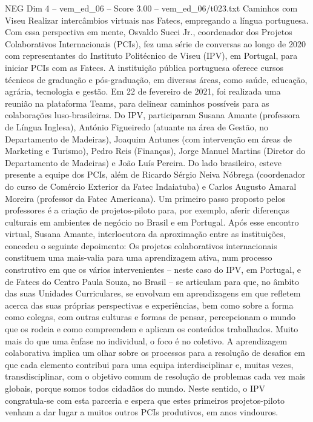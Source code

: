 \begin{textsample}{NEG Dim 4 – vem\_ed\_06 – Score 3.00 – vem\_ed\_06/t023.txt}  \label{ex:f4_neg_048}
Caminhos com Viseu Realizar intercâmbios virtuais nas Fatecs, empregando a língua portuguesa.
Com essa perspectiva em mente, Osvaldo Succi Jr., coordenador dos Projetos Colaborativos Internacionais (PCIs), fez uma série de conversas ao longo de 2020 com representantes do Instituto Politécnico de Viseu (IPV), em Portugal, para iniciar PCIs com as Fatecs.
A instituição pública portuguesa oferece cursos técnicos de graduação e pós-graduação, em diversas áreas, como saúde, educação, agrária, tecnologia e gestão.
Em 22 de fevereiro de 2021, foi realizada uma reunião na plataforma Teams, para delinear caminhos possíveis para as colaborações luso-brasileiras.
Do IPV, participaram Susana Amante (professora de Língua Inglesa), António Figueiredo (atuante na área de Gestão, no Departamento de Madeiras), Joaquim Antunes (com intervenção em áreas de Marketing e Turismo), Pedro Reis (Finanças), Jorge Manuel Martins (Diretor do Departamento de Madeiras) e João Luís Pereira.
Do lado brasileiro, esteve presente a equipe dos PCIs, além de Ricardo Sérgio Neiva Nóbrega (coordenador do curso de Comércio Exterior da Fatec Indaiatuba) e Carlos Augusto Amaral Moreira (professor da Fatec Americana).
Um primeiro passo proposto pelos professores é a criação de projetos-piloto para, por exemplo, aferir diferenças culturais em ambientes de negócio no Brasil e em Portugal.
Após esse encontro virtual, Susana Amante, interlocutora da aproximação entre as instituições, concedeu o seguinte depoimento: Os projetos colaborativos internacionais constituem uma mais-valia para uma aprendizagem ativa, num processo construtivo em que os vários intervenientes – neste caso do IPV, em Portugal, e de Fatecs do Centro Paula Souza, no Brasil – se articulam para que, no âmbito das suas Unidades Curriculares, se envolvam em aprendizagens em que refletem acerca das suas próprias perspectivas e experiências, bem como sobre a forma como colegas, com outras culturas e formas de pensar, percepcionam o mundo que os rodeia e como compreendem e aplicam os conteúdos trabalhados.
Muito mais do que uma ênfase no individual, o foco é no coletivo.
A aprendizagem colaborativa implica um olhar sobre os processos para a resolução de desafios em que cada elemento contribui para uma equipa interdisciplinar e, muitas vezes, transdisciplinar, com o objetivo comum de resolução de problemas cada vez mais globais, porque somos todos cidadãos do mundo.
Neste sentido, o IPV congratula-se com esta parceria e espera que estes primeiros projetos-piloto venham a dar lugar a muitos outros PCIs produtivos, em anos vindouros.

\end{textsample}

